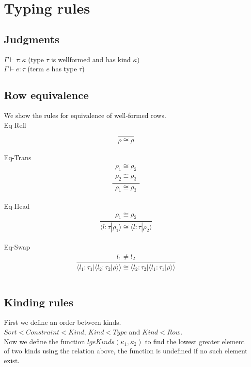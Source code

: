 \documentclass[12pt]{article}
\newcommand\llabel[0]{l}
\newcommand\kind[0]{\kappa} %
\newcommand\textend[3]{\langle#1:#2|#3\rangle} %
\newcommand\term[0]{e} %
\begin{document}
\newpage
\section{Typing rules}

\subsection{Judgments}
$\Gamma \vdash \tau : \kind$ (type $\tau$ is wellformed and has kind $\kind$) \\
$\Gamma \vdash \term : \tau$ (term $\term$ has type $\tau$) \\

\subsection{Row equivalence}
We show the rules for equivalence of well-formed rows. \\
Eq-Refl \[\frac{
	\begin{array}{l}
	\end{array}
}{
	\rho \cong \rho
}\]\\
Eq-Trans \[\frac{
	\begin{array}{l}
	\rho_1 \cong \rho_2 \\
	\rho_2 \cong \rho_3
	\end{array}
}{
	\rho_1 \cong \rho_3
}\]\\
Eq-Head \[\frac{
	\begin{array}{l}
	\rho_1 \cong \rho_2
	\end{array}
}{
	\textend{\llabel}{\tau}{\rho_1} \cong \textend{\llabel}{\tau}{\rho_2}
}\]\\
Eq-Swap \[\frac{
	\begin{array}{l}
	\llabel_1 \neq \llabel_2
	\end{array}
}{
	\textend{\llabel_1}{\tau_1}{\textend{\llabel_2}{\tau_2}{\rho}} \cong \textend{\llabel_2}{\tau_2}{\textend{\llabel_1}{\tau_1}{\rho}}
}\]\\

\subsection{Kinding rules}
First we define an order between kinds. \\
$Sort < Constraint < Kind$, $Kind < Type$ and $Kind < Row$. \\
Now we define the function $\textit{lgeKinds}(\kind_1, \kind_2)$ to find the lowest greater element of two kinds using the relation above, the function is undefined if no such element exist. \\
\end{document}
